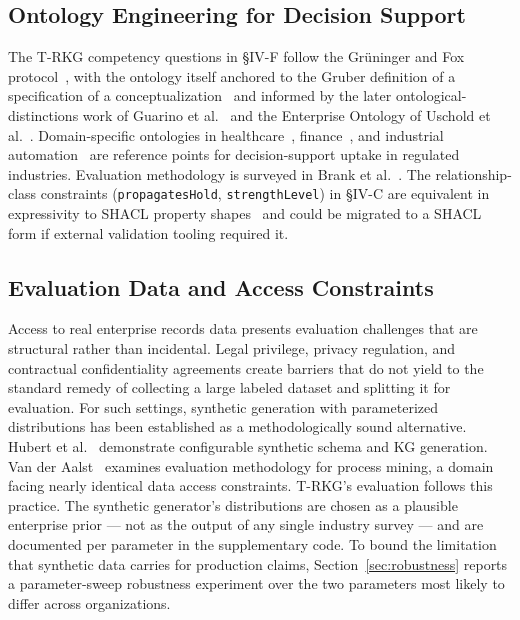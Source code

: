 \documentclass{ieeeaccess}
\begin{document}
\subsection{Ontology Engineering for Decision Support}

The T-RKG competency questions in §IV-F follow the Gr\"{u}ninger and Fox protocol~\cite{gruninger1995}, with the ontology itself anchored to the Gruber definition of a specification of a conceptualization~\cite{gruber1995} and informed by the later ontological-distinctions work of Guarino et al.~\cite{guarino2009} and the Enterprise Ontology of Uschold et al.~\cite{uschold1998}. Domain-specific ontologies in healthcare~\cite{schriml2019}, finance~\cite{fibo}, and industrial automation~\cite{ringsquandl2015} are reference points for decision-support uptake in regulated industries. Evaluation methodology is surveyed in Brank et al.~\cite{brank2005}. The relationship-class constraints (\texttt{propagatesHold}, \texttt{strengthLevel}) in §IV-C are equivalent in expressivity to SHACL property shapes~\cite{shacl} and could be migrated to a SHACL form if external validation tooling required it.

\subsection{Evaluation Data and Access Constraints}

Access to real enterprise records data presents evaluation challenges that are structural rather than incidental. Legal privilege, privacy regulation, and contractual confidentiality agreements create barriers that do not yield to the standard remedy of collecting a large labeled dataset and splitting it for evaluation. For such settings, synthetic generation with parameterized distributions has been established as a methodologically sound alternative. Hubert et al.~\cite{pygraft} demonstrate configurable synthetic schema and KG generation. Van der Aalst~\cite{vanderaalst2016} examines evaluation methodology for process mining, a domain facing nearly identical data access constraints. T-RKG's evaluation follows this practice. The synthetic generator's distributions are chosen as a plausible enterprise prior — not as the output of any single industry survey — and are documented per parameter in the supplementary code. To bound the limitation that synthetic data carries for production claims, Section~\ref{sec:robustness} reports a parameter-sweep robustness experiment over the two parameters most likely to differ across organizations.
\end{document}
